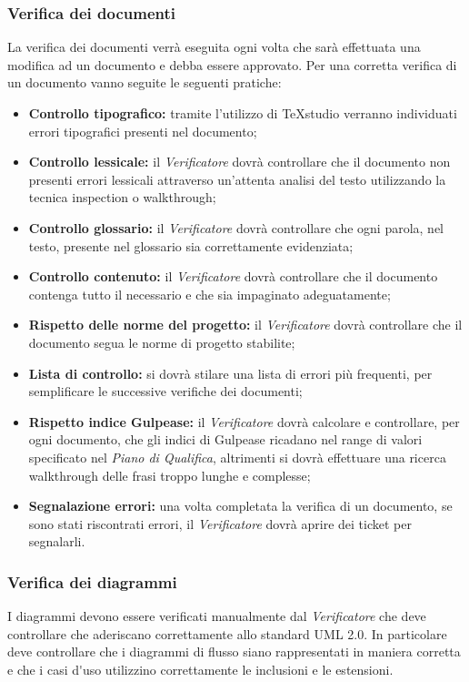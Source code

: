 \subsubsection{Verifica dei documenti}
La verifica dei documenti verrà eseguita ogni volta che sarà effettuata una modifica ad un documento e debba essere approvato.
Per una corretta verifica di un documento vanno seguite le seguenti pratiche:

\begin{itemize}
	\item \textbf{Controllo tipografico: }tramite l'utilizzo di TeXstudio verranno individuati errori tipografici presenti nel documento;
	\item \textbf{Controllo lessicale: }il \textit{Verificatore} dovrà controllare che il documento non presenti errori lessicali attraverso un'attenta analisi del testo utilizzando la tecnica \gls{inspection} o \gls{walkthrough};
	\item \textbf{Controllo glossario: }il \textit{Verificatore} dovrà controllare che ogni parola, nel testo, presente nel glossario sia correttamente evidenziata;
	\item \textbf{Controllo contenuto: }il \textit{Verificatore} dovrà controllare che il documento contenga tutto il necessario e che sia impaginato adeguatamente;
	\item \textbf{Rispetto delle norme del progetto: }il \textit{Verificatore} dovrà controllare che il documento segua le norme di progetto stabilite;
	\item \textbf{Lista di controllo: }si dovrà stilare una lista di errori più frequenti, per semplificare le successive verifiche dei documenti;
	\item \textbf{Rispetto \gls{indice Gulpease}: }il \textit{Verificatore} dovrà calcolare e controllare, per ogni documento, che gli \gls{indici di Gulpease} ricadano nel range di valori specificato nel \textit{Piano di Qualifica}, altrimenti si dovrà effettuare una ricerca \gls{walkthrough} delle frasi troppo lunghe e complesse;
	\item \textbf{Segnalazione errori: }una volta completata la verifica di un documento, se sono stati riscontrati errori, il \textit{Verificatore} dovrà aprire dei \gls{ticket} per segnalarli.
\end{itemize}
	
\subsubsection{Verifica dei diagrammi}
I diagrammi devono essere verificati manualmente dal \textit{Verificatore} che deve controllare che aderiscano correttamente allo standard \gls{UML} 2.0.
In particolare deve controllare che i diagrammi di flusso siano rappresentati in maniera corretta e che i \gls{casi d'uso} utilizzino correttamente le inclusioni e le estensioni.


